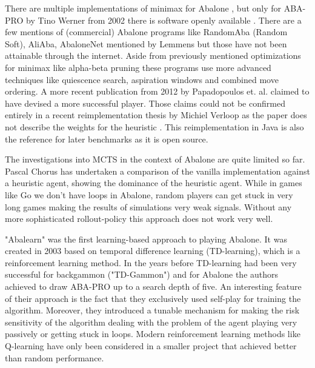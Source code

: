 There are multiple implementations of minimax for Abalone \cite{chorus_implementing_2009,lemmens_constructing_2005,ozcan_simple_2004-1,aichholzer_algorithmic_2002}, but only for ABA-PRO by Tino Werner from 2002 there is software openly available \cite{aichholzer_oswin_2006}.  There are a few mentions of (commercial) Abalone programs like RandomAba (Random Soft), AliAba, AbaloneNet mentioned by Lemmens \cite[p. 7]{lemmens_constructing_2005} but those have not been attainable through the internet. Aside from previously mentioned optimizations for minimax like alpha-beta pruning these programs use more advanced techniques like quiescence search, aspiration windows and combined move ordering. A more recent publication from 2012 by Papadopoulos et. al. claimed to have devised a more successful player. \cite{papadopoulos_exploring_2012}  Those claims could not be confirmed entirely in a recent reimplementation thesis by Michiel Verloop as the paper does not describe the weights for the heuristic \cite{verloop_critical_nodate}. This reimplementation in Java \cite{verloop_abaloneai_nodate} is also the reference for later benchmarks as it is open source. \cite{verloop_abaloneai_nodate}

The investigations into MCTS in the context of Abalone are quite limited so far. Pascal Chorus has undertaken a comparison of the vanilla implementation against a heuristic agent, showing the dominance of the heuristic agent. \cite{chorus_implementing_2009} While in games like Go we don't have loops in Abalone, random players can get stuck in very long games making the results of simulations very weak signals. Without any more sophisticated rollout-policy this approach does not work very well.

"Abalearn" was the first learning-based approach to playing Abalone. \cite{campos_abalearn_2003} It was created in 2003 based on temporal difference learning (TD-learning), which is a reinforcement learning method. In the years before TD-learning had been very successful for backgammon ("TD-Gammon") \cite{tesauro_td-gammon_1994} and for Abalone the authors achieved to draw ABA-PRO up to a search depth of five. An interesting feature of their approach is the fact that they exclusively used self-play for training the algorithm. Moreover, they introduced a tunable mechanism for making the risk sensitivity of the algorithm dealing with the problem of the agent playing very passively or getting stuck in loops. Modern reinforcement learning methods like Q-learning have only been considered in a smaller project that achieved better than random performance. \cite{mizrachi_introduction_2017}

